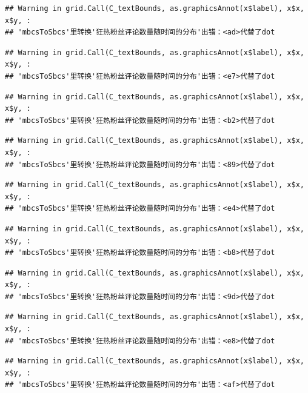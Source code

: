 \documentclass[
]{article}
\begin{document}
\begin{verbatim}
## Warning in grid.Call(C_textBounds, as.graphicsAnnot(x$label), x$x, x$y, :
## 'mbcsToSbcs'里转换'狂热粉丝评论数量随时间的分布'出错：<ad>代替了dot
\end{verbatim}

\begin{verbatim}
## Warning in grid.Call(C_textBounds, as.graphicsAnnot(x$label), x$x, x$y, :
## 'mbcsToSbcs'里转换'狂热粉丝评论数量随时间的分布'出错：<e7>代替了dot
\end{verbatim}

\begin{verbatim}
## Warning in grid.Call(C_textBounds, as.graphicsAnnot(x$label), x$x, x$y, :
## 'mbcsToSbcs'里转换'狂热粉丝评论数量随时间的分布'出错：<b2>代替了dot
\end{verbatim}

\begin{verbatim}
## Warning in grid.Call(C_textBounds, as.graphicsAnnot(x$label), x$x, x$y, :
## 'mbcsToSbcs'里转换'狂热粉丝评论数量随时间的分布'出错：<89>代替了dot
\end{verbatim}

\begin{verbatim}
## Warning in grid.Call(C_textBounds, as.graphicsAnnot(x$label), x$x, x$y, :
## 'mbcsToSbcs'里转换'狂热粉丝评论数量随时间的分布'出错：<e4>代替了dot
\end{verbatim}

\begin{verbatim}
## Warning in grid.Call(C_textBounds, as.graphicsAnnot(x$label), x$x, x$y, :
## 'mbcsToSbcs'里转换'狂热粉丝评论数量随时间的分布'出错：<b8>代替了dot
\end{verbatim}

\begin{verbatim}
## Warning in grid.Call(C_textBounds, as.graphicsAnnot(x$label), x$x, x$y, :
## 'mbcsToSbcs'里转换'狂热粉丝评论数量随时间的分布'出错：<9d>代替了dot
\end{verbatim}

\begin{verbatim}
## Warning in grid.Call(C_textBounds, as.graphicsAnnot(x$label), x$x, x$y, :
## 'mbcsToSbcs'里转换'狂热粉丝评论数量随时间的分布'出错：<e8>代替了dot
\end{verbatim}

\begin{verbatim}
## Warning in grid.Call(C_textBounds, as.graphicsAnnot(x$label), x$x, x$y, :
## 'mbcsToSbcs'里转换'狂热粉丝评论数量随时间的分布'出错：<af>代替了dot
\end{verbatim}
\end{document}
